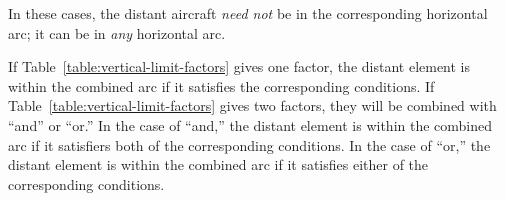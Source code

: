 {\begin{itemize}
In these cases, the distant aircraft \emph{need not} be in the corresponding horizontal arc; it can be in \emph{any} horizontal arc.

\end{itemize}

If Table~\ref{table:vertical-limit-factors} gives one factor, the distant element is within the combined arc if it satisfies the corresponding conditions. If Table~\ref{table:vertical-limit-factors} gives two factors, they will be combined with “and” or “or.” In the case of “and,” the distant element is within the combined arc if it satisfiers both of the corresponding conditions. In the case of “or,” the distant element is within the combined arc if it satisfies either of the corresponding conditions.
}

